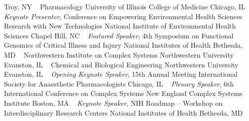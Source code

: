 Troy, NY
\newline
~
\Gap
{}
Pharmacology
\newline
    University of Illinois College of Medicine
    \newline
Chicago, IL
\newline
~
\Gap
{}
\textit{Keynote Presenter}, Conference on Empowering Environmental Health Sciences Research with New Technologies
\newline
    National Institute of Environmental Health Sciences
    \newline
Chapel Hill, NC
\newline
~
\Gap
{}
\textit{Featured Speaker}, 4th Symposium on Functional Genomics of Critical Illness and Injury
\newline
    National Institutes of Health
    \newline
Bethesda, MD
\newline
~
\Gap
{}
Northwestern Institute on Complex Systems
\newline
    Northwestern University
    \newline
Evanston, IL
\newline
~
\Gap
{}
Chemical and Biological Engineering
\newline
    Northwestern University
    \newline
Evanston, IL
\newline
~
\Gap
{}
\textit{Opening Keynote Speaker}, 15th Annual Meeting 
\newline
    International Society for Anaesthetic Pharmacologists
    \newline
Chicago, IL
\newline
~
\Gap
{}
\textit{Plenary Speaker}, 6th International Conference on Complex Systems
\newline
    New England Complex Systems Institute
    \newline
Boston, MA
\newline
~
\Gap
{}
\textit{Keynote Speaker}, NIH Roadmap -- Workshop on Interdisciplinary Research Centers
\newline
    National Institutes of Health
    \newline
Bethesda, MD
\newline

